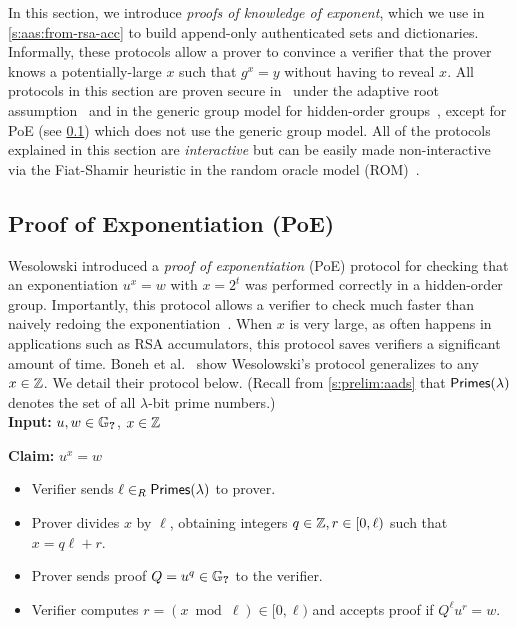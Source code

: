 In this section, we introduce \textit{proofs of knowledge of exponent}, which we use in \cref{s:aas:from-rsa-acc} to build append-only authenticated sets and dictionaries.
Informally, these protocols allow a prover to convince a verifier that the prover knows a potentially-large $x$ such that $g^x = y$ without having to reveal $x$.
All protocols in this section are proven secure in~\cite{BBF18} under the adaptive root assumption~\cite{Wesolowski19} and in the generic group model for hidden-order groups~\cite{DK02}, except for PoE (see \cref{s:prelim:poe}) which does not use the generic group model.
All of the protocols explained in this section are \textit{interactive} but can be easily made non-interactive via the Fiat-Shamir heuristic in the random oracle model (ROM)~\cite{FS87}.


\subsection{Proof of Exponentiation (PoE)}
\label{s:prelim:poe}
Wesolowski introduced a \textit{proof of exponentiation} (PoE) protocol for checking that an exponentiation $u^x = w$ with $x=2^t$ was performed correctly in a hidden-order group.
Importantly, this protocol allows a verifier to check much faster than naively redoing the exponentiation~\cite{Wesolowski19}.
When $x$ is very large, as often happens in applications such as RSA accumulators, this protocol saves verifiers a significant amount of time.
Boneh et al.~\cite{BBF19} show Wesolowski's protocol generalizes to any $x\in \mathbb{Z}$.
We detail their protocol below.
(Recall from \cref{s:prelim:aads} that $\mathsf{Primes}(\lambda)$ denotes the set of all $\lambda$-bit prime numbers.)
\\

\noindent \textbf{Input:} $u,w\in \mathbb{G}_{\textbf{?}}$, $x\in \mathbb{Z}$

\noindent \textbf{Claim:} $u^x = w$
\begin{itemize}
\item Verifier sends $\ell \in_R \mathsf{Primes}(\lambda)$ to prover.
\item Prover divides $x$ by $\ell$, obtaining integers $q\in \mathbb{Z},r\in [0,\ell)$ such that $x = q\ell + r$.
\item Prover sends proof $Q=u^{q}\in \mathbb{G}_{\textbf{?}}$ to the verifier.
\item Verifier computes $r = (x \bmod \ell) \in [0, \ell)$ and accepts proof if $Q^\ell u^{r} = w$.
\end{itemize}

